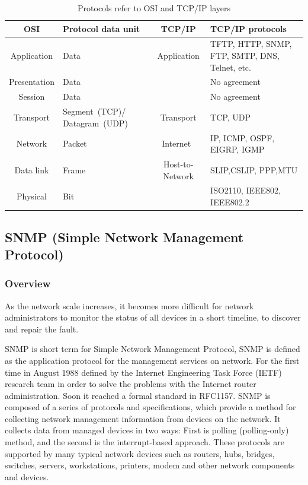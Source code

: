 \begin{table}[h]
\begin{longtable}{| c | p{8em} | c | p{12em} |}
\hline
\textbf{OSI} & \textbf{Protocol data unit} & \textbf{TCP/IP} & \textbf{TCP/IP protocols} \\ \hline
Application & Data & Application & TFTP, HTTP, SNMP, FTP, SMTP, DNS, Telnet, etc. \\ \hline
Presentation & Data &  & No agreement \\ \hline
Session & Data & & No agreement \\ \hline
Transport & Segment (TCP)/ Datagram (UDP) & Transport & TCP, UDP \\ \hline
Network & Packet & Internet & IP, ICMP, OSPF, EIGRP, IGMP \\ \hline
Data link & Frame & Host-to-Network & SLIP,CSLIP, PPP,MTU \\ \cline{1-2} \cline{4-4}
Physical & Bit & & ISO2110, IEEE802, IEEE802.2\\
\hline
\end{longtable}
\caption{Protocols refer to OSI and TCP/IP layers}
\end{table}

\subsection{SNMP (Simple Network Management Protocol)}

\subsubsection{Overview}

As the network scale increases, it becomes more difficult for network administrators to monitor the status of all devices in a short timeline, to discover and repair the fault.  

SNMP is short term for Simple Network Management Protocol, SNMP is defined as the application protocol for the management services on network. For the first time in August 1988 defined by the Internet Engineering Task Force (IETF) research team in order to solve the problems with the Internet router administration. Soon it reached a formal standard in RFC1157\cite{rfc1157}. SNMP is composed of a series of protocols and specifications, which provide a method for collecting network management information from devices on the network. It collects data from managed devices in two ways: First is polling (polling-only) method, and the second is the interrupt-based approach. These protocols are supported by many typical network devices such as routers, hubs, bridges, switches, servers, workstations, printers, modem and other network components and devices.

